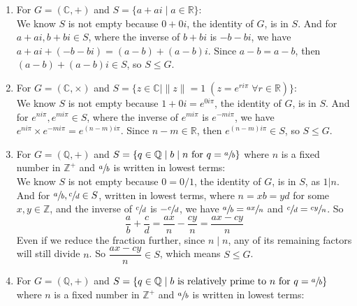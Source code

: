 \documentclass[12pt]{article}
\newcommand{\Z}{\mathbb{Z}}
\newcommand{\Q}{\mathbb{Q}}
\newcommand{\R}{\mathbb{R}}
\newcommand{\C}{\mathbb{C}}
\begin{document}
    \begin{enumerate}[label=\textbf{\alph*.}]
        \item 
            For $G = (\C, +)$ and $S = \{ a + ai \mid a \in \R \}$: \\
            We know $S$ is not empty because $0 + 0i$,
            the identity of $G$, is in $S$.
            And for $a + ai, b + bi \in S$,
            where the inverse of $b + bi$ is $-b -bi$,
            we have $a + ai + (-b -bi) = (a-b) + (a-b)i$.
            Since $a-b = a-b$,
            then $(a-b) + (a-b)i \in S$,
            so $S \leqslant G$.
        \item 
            For $G = (\C, \times)$ and $S = \{ z \in \C \mid \|z\| = 1
            \; (z = e^{ri\pi} \; \forall r \in \R)\}$: \\
            We know $S$ is not empty because $1 + 0i = e^{0i\pi}$,
            the identity of $G$, is in $S$.
            And for $e^{ni\pi}, e^{mi\pi} \in S$,
            where the inverse of $e^{mi\pi}$ is $e^{-mi\pi}$,
            we have $e^{ni\pi} \times e^{-mi\pi} = e^{(n - m)i\pi}$.
            Since $n - m \in \R$,
            then $e^{(n - m)i\pi} \in S$,
            so $S \leqslant G$.
        \item 
            For $G = (\Q, +)$ and $S = \{ q \in \Q \mid b \mid n 
            \text{ for } q = \sfrac{a}{b} \}$
            where $n$ is a fixed number in $\Z^+$
            and $\sfrac{a}{b}$ is written in lowest terms: \\
            We know $S$ is not empty because $0 = 0/1$,
            the identity of $G$, is in $S$,
            as $1|n$.
            And for $\sfrac{a}{b}, \sfrac{c}{d} \in S$,
            written in lowest terms,
            where $n = xb = yd$ for some $x, y \in \Z$,
            and the inverse of $\sfrac{c}{d}$ is $-\sfrac{c}{d}$,
            we have $\sfrac{a}{b} = \sfrac{ax}{n}$
            and $\sfrac{c}{d} = \sfrac{cy}{n}$. 
            So \[\dfrac{a}{b} + \dfrac{c}{d} = 
            \dfrac{ax}{n} - \dfrac{cy}{n} = \dfrac{ax - cy}{n}\]
            Even if we reduce the fraction further, since $n \mid n$,
            any of its remaining factors will still divide $n$.
            So $\dfrac{ax - cy}{n} \in S$,
            which means $S \leqslant G$.
        \item 
            For $G = (\Q, +)$ and $S = \{ q \in \Q \mid b \text{ is
            relatively prime to $n$ for } q = \sfrac{a}{b} \}$
            where $n$ is a fixed number in $\Z^+$
            and $\sfrac{a}{b}$ is written in lowest terms: \\

\end{enumerate}
\end{document}
